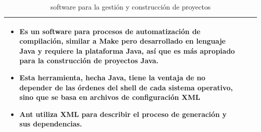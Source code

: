 \begin{table}[b!]
\begin{tabular}{|p{2cm}|ll}
{\begin{itemize}
		\item Es un software para procesos de automatización de compilación, similar a Make pero desarrollado en lenguaje Java y requiere la plataforma Java, así que es más apropiado para la construcción de proyectos Java.
		\item Esta herramienta, hecha Java, tiene la ventaja de no depender de las órdenes del shell de cada sistema operativo, sino que se basa en archivos de configuración XML 
		\item  Ant utiliza XML para describir el proceso de generación y sus dependencias. \cite{37}
		\end{itemize}} \\ 
		\hline
	\end{tabular}
	\caption{ software para la gestión y construcción de proyectos}
	\label{table:Cuadro Comparativo de software para la gestión y construcción de proyectos}
\end{table}

